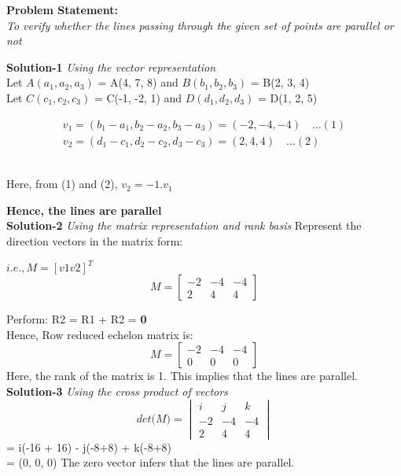 \documentclass[a4paper,12pt]{article}
\begin{document}
\begin{flushleft}	
\textbf{Problem Statement:} \\
\textit{To verify whether the lines passing through the given set of points are parallel or not} \vspace{5mm}

\textbf{Solution-1}
\textit{Using the vector representation} \\
Let $A(a_1, a_2, a_3)$ = A(4, 7, 8) and $B(b_1, b_2, b_3)$ = B(2, 3, 4) \\
Let $C(c_1, c_2, c_3)$ = C(-1, -2, 1) and $D(d_1, d_2, d_3)$ = D(1, 2, 5)

\begin{align*}
v_1 = (b_1-a_1, b_2-a_2, b_3-a_3) = (-2, -4, -4) \quad ...(1) \\
v_2 = (d_1-c_1, d_2-c_2, d_3-c_3) = (2, 4, 4) \quad ...(2)
\end{align*}

\\
Here, from (1) and (2), $v_2 = -1 . v_1$

\textbf{Hence, the lines are parallel} \\
\vspace{5mm}
\textbf{Solution-2} \textit{Using the matrix representation and rank basis}	
Represent the direction vectors in the matrix form: 

$i.e., M = [v1 v2]^T$
$$
M =
\begin{bmatrix}
	-2 & -4 & -4\\
	 2 &  4 &  4
\end{bmatrix}
$$

Perform: R2 = R1 + R2 = \textbf{0} \\
Hence, Row reduced echelon matrix is:
$$
M = 
\begin{bmatrix}
	-2 & -4 & -4\\
	 0 &  0 &  0
\end{bmatrix}
$$
Here, the rank of the matrix is 1. This implies that the lines are parallel.\\
\vspace{5mm}
\textbf{Solution-3} \textit{Using the cross product of vectors}\\
$$
\textit{det(M)}= 
\begin{vmatrix}
 i &  j &  k \\
-2 & -4 & -4 \\
 2 &  4 &  4
\end{vmatrix}
$$
 = i(-16 + 16) - j(-8+8) + k(-8+8)\\
 = (0, 0, 0)
The zero vector infers that the lines are parallel.

\end{flushleft}
\end{document}
